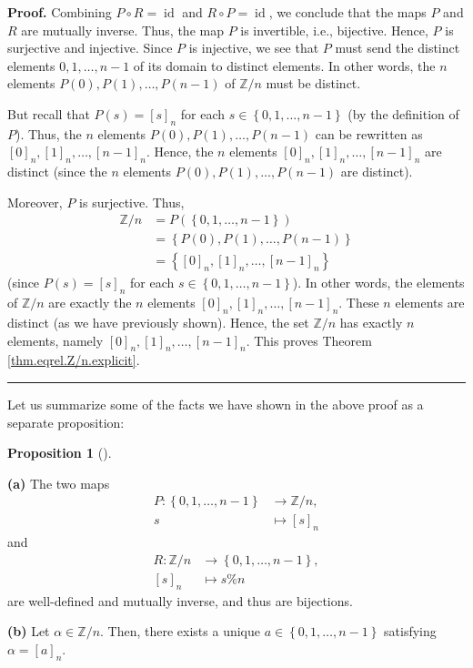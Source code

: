 \documentclass[numbers=enddot,12pt,final,onecolumn,notitlepage]{scrartcl}%
\numberwithin{exer}{subsection}
\theoremstyle{definition}
\newtheorem{prop}[theo]{Proposition}
\newenvironment{proposition}[1][]
{\begin{prop}[#1]\begin{leftbar}}
{\end{leftbar}\end{prop}}
\newenvironment{proof}[1][Proof]{\noindent\textbf{#1.} }{\ \rule{0.5em}{0.5em}}
\begin{document}
\begin{proof}
Combining $P\circ R=\operatorname*{id}$ and $R\circ P=\operatorname*{id}$, we
conclude that the maps $P$ and $R$ are mutually inverse. Thus, the map $P$ is
invertible, i.e., bijective. Hence, $P$ is surjective and injective. Since $P$
is injective, we see that $P$ must send the distinct elements $0,1,\ldots,n-1$
of its domain to distinct elements. In other words, the $n$ elements $P\left(
0\right)  ,P\left(  1\right)  ,\ldots,P\left(  n-1\right)  $ of $\mathbb{Z}/n$
must be distinct.

But recall that $P\left(  s\right)  =\left[  s\right]  _{n}$ for each
$s\in\left\{  0,1,\ldots,n-1\right\}  $ (by the definition of $P$). Thus, the
$n$ elements $P\left(  0\right)  ,P\left(  1\right)  ,\ldots,P\left(
n-1\right)  $ can be rewritten as $\left[  0\right]  _{n},\left[  1\right]
_{n},\ldots,\left[  n-1\right]  _{n}$. Hence, the $n$ elements $\left[
0\right]  _{n},\left[  1\right]  _{n},\ldots,\left[  n-1\right]  _{n}$ are
distinct (since the $n$ elements $P\left(  0\right)  ,P\left(  1\right)
,\ldots,P\left(  n-1\right)  $ are distinct).

Moreover, $P$ is surjective. Thus,%
\begin{align*}
\mathbb{Z}/n  &  =P\left(  \left\{  0,1,\ldots,n-1\right\}  \right) \\
&  =\left\{  P\left(  0\right)  ,P\left(  1\right)  ,\ldots,P\left(
n-1\right)  \right\} \\
&  =\left\{  \left[  0\right]  _{n},\left[  1\right]  _{n},\ldots,\left[
n-1\right]  _{n}\right\}
\end{align*}
(since $P\left(  s\right)  =\left[  s\right]  _{n}$ for each $s\in\left\{
0,1,\ldots,n-1\right\}  $). In other words, the elements of $\mathbb{Z}/n$ are
exactly the $n$ elements $\left[  0\right]  _{n},\left[  1\right]  _{n}%
,\ldots,\left[  n-1\right]  _{n}$. These $n$ elements are distinct (as we have
previously shown). Hence, the set $\mathbb{Z}/n$ has exactly $n$ elements,
namely $\left[  0\right]  _{n},\left[  1\right]  _{n},\ldots,\left[
n-1\right]  _{n}$. This proves Theorem \ref{thm.eqrel.Z/n.explicit}.
\end{proof}

Let us summarize some of the facts we have shown in the above proof as a
separate proposition:

\begin{proposition}
\label{prop.eqrel.Z/n.PR}\textbf{(a)} The two maps%
\begin{align*}
P:\left\{  0,1,\ldots,n-1\right\}   &  \rightarrow\mathbb{Z}/n,\\
s  &  \mapsto\left[  s\right]  _{n}%
\end{align*}
and%
\begin{align*}
R:\mathbb{Z}/n  &  \rightarrow\left\{  0,1,\ldots,n-1\right\}  ,\\
\left[  s\right]  _{n}  &  \mapsto s\%n
\end{align*}
are well-defined and mutually inverse, and thus are bijections.

\textbf{(b)} Let $\alpha\in\mathbb{Z}/n$. Then, there exists a unique
$a\in\left\{  0,1,\ldots,n-1\right\}  $ satisfying $\alpha=\left[  a\right]
_{n}$.
\end{proposition}
\end{document}
